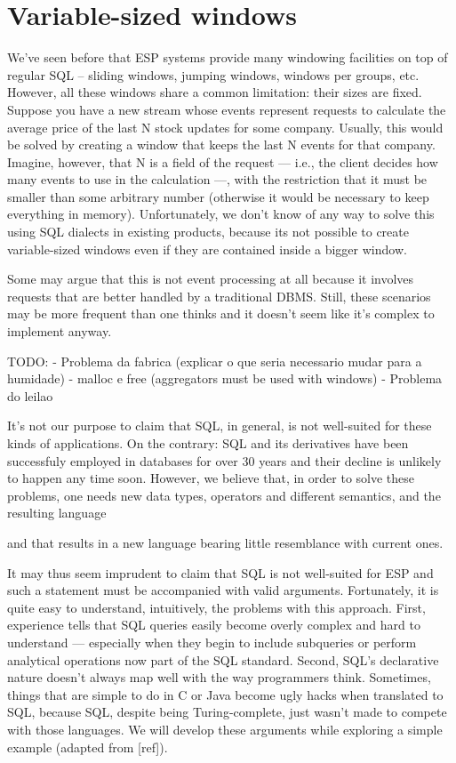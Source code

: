 \documentclass{report}
\begin{document}
\section{Variable-sized windows}

We've seen before that ESP systems provide many windowing facilities
on top of regular SQL -- sliding windows, jumping windows, windows per
groups, etc. However, all these windows share a common limitation:
their sizes are fixed. Suppose you have a new stream whose events
represent requests to calculate the average price of the last N stock
updates for some company. Usually, this would be solved by creating a
window that keeps the last N events for that company. Imagine,
however, that N is a field of the request --- i.e., the client decides
how many events to use in the calculation ---, with the restriction
that it must be smaller than some arbitrary number (otherwise it would
be necessary to keep everything in memory). Unfortunately, we don't
know of any way to solve this using SQL dialects in existing products,
because its not possible to create variable-sized windows even if they
are contained inside a bigger window.

Some may argue that this is not event processing at all because it
involves requests that are better handled by a traditional
DBMS. Still, these scenarios may be more frequent than one thinks and
it doesn't seem like it's complex to implement anyway.





TODO:
 - Problema da fabrica (explicar o que seria necessario mudar para a humidade)
 - malloc e free (aggregators must be used with windows)
 - Problema do leilao



 It's not our purpose to claim that SQL, in general, is not
well-suited for these kinds of applications. On the contrary: SQL and
its derivatives have been successfuly employed in databases for over
30 years and their decline is unlikely to happen any time
soon. However, we believe that, in order to solve these problems, one
needs new data types, operators and different semantics, and the resulting language 

 and that results in a
new language bearing little resemblance with current ones.



 It may
thus seem imprudent to claim that SQL is not well-suited for ESP and
such a statement must be accompanied with valid
arguments. Fortunately, it is quite easy to understand, intuitively,
the problems with this approach. First, experience tells that SQL
queries easily become overly complex and hard to understand ---
especially when they begin to include subqueries or perform analytical
operations now part of the SQL standard. Second, SQL's declarative
nature doesn't always map well with the way programmers
think. Sometimes, things that are simple to do in C or Java become
ugly hacks when translated to SQL, because SQL, despite being
Turing-complete, just wasn't made to compete with those languages. We
will develop these arguments while exploring a simple example (adapted
from [ref]).
\end{document}
